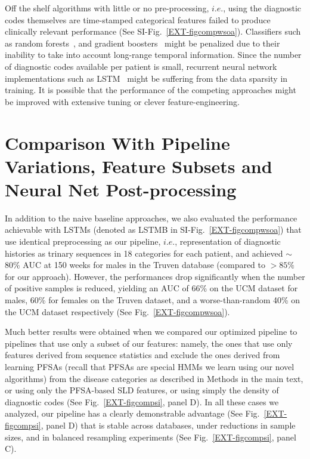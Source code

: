 \documentclass[onecolumn,,10pt]{IEEEtran}
\begin{document}
Off the shelf algorithms with little or no pre-processing, $i.e.$, using the diagnostic codes themselves are time-stamped categorical features failed to produce clinically relevant performance (See SI-Fig.~\ref{EXT-figcompwsoa}). Classifiers such as random forests~\cite{breiman}, and gradient boosters~\cite{friedman} might be penalized due to their inability to take into account long-range temporal information. Since the number of diagnostic codes available per patient is small, recurrent neural network implementations such as LSTM~\cite{hochreiter} might be suffering from the data sparsity in training. It is possible that the performance of the competing approaches might be improved with extensive tuning or clever feature-engineering.
\section{Comparison With  Pipeline Variations, Feature Subsets and Neural Net Post-processing}\label{sec:pipelinevar}
In addition to the naive baseline approaches, we also evaluated the performance achievable  with LSTMs (denoted as LSTMB in SI-Fig.~\ref{EXT-figcompwsoa}) that use identical preprocessing as our pipeline, $i.e.$, representation of diagnostic histories as trinary sequences in 18 categories for each patient, and achieved $\sim$80\% AUC  at 150 weeks for males in the Truven database (compared to $> 85\%$ for our approach). However, the performances drop significantly when the number of positive samples is reduced, yielding an AUC of 66\% on the UCM dataset for males, 60\% for females on the Truven dataset, and a  worse-than-random 40\% on the UCM dataset respectively (See Fig.~\ref{EXT-figcompwsoa}). 

  Much better results were obtained when we compared our optimized pipeline to pipelines that use only a subset of our features: namely, the  ones that use only features derived from sequence statistics and exclude the ones derived from learning PFSAs (recall that PFSAs are special HMMs we learn using our novel algorithms)  from the disease categories as described in Methods in the main text, or using only the PFSA-based SLD features, or using simply the density of diagnostic codes (See Fig.~\ref{EXT-figcompsi}, panel D). In all these cases we analyzed, our pipeline has a clearly demonstrable advantage (See  Fig.~\ref{EXT-figcompsi}, panel D) that is stable across databases,  under reductions in sample sizes, and in balanced resampling experiments (See Fig.~\ref{EXT-figcompsi}, panel C).
  
\end{document}
